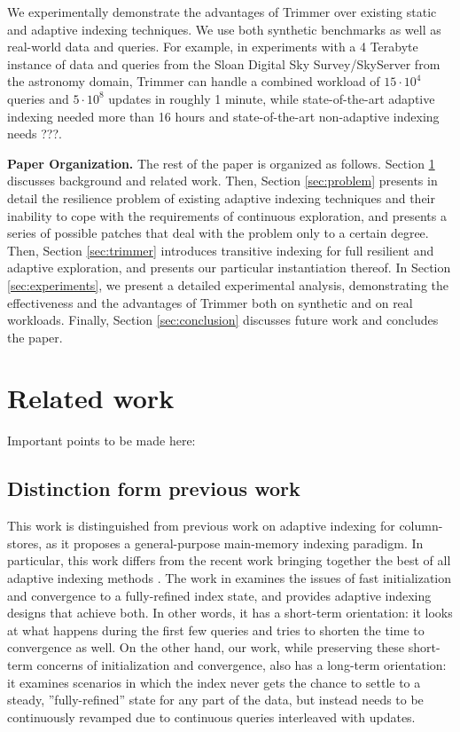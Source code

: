 \documentclass{sig-alternate}
\begin{document}
We experimentally demonstrate the advantages of Trimmer over existing static and adaptive indexing techniques. We use both synthetic benchmarks as well as real-world data and queries. For example, in experiments with a 4 Terabyte instance of data and queries from the Sloan Digital Sky Survey/SkyServer from the astronomy domain, Trimmer can handle a combined workload of $15\cdot10^4$ queries and $5\cdot10^8$ updates in roughly 1 minute, while state-of-the-art adaptive indexing needed more than 16 hours and state-of-the-art non-adaptive indexing needs ???.

\textbf{Paper Organization.}
The rest of the paper is organized as follows. Section \ref{sec:related} discusses background and related work. Then, Section \ref{sec:problem} presents in detail the resilience problem of existing adaptive indexing techniques and their inability to cope with the requirements of continuous exploration, and presents a series of possible patches that deal with the problem only to a certain degree. Then, Section \ref{sec:trimmer} introduces transitive indexing for full resilient and adaptive exploration, and presents our particular instantiation thereof. In Section \ref{sec:experiments}, we present a detailed experimental analysis, demonstrating the effectiveness and the advantages of Trimmer both on synthetic and on real workloads. Finally, Section \ref{sec:conclusion} discusses future work and concludes the paper.


\section{Related work}\label{sec:related}

Important points to be made here:

\subsection{Distinction form previous work}

This work is distinguished from previous work on adaptive indexing for column-stores, as it proposes a general-purpose main-memory indexing paradigm. In particular, this work differs from the recent work bringing together the best of all adaptive indexing methods \cite{AdaptiveIndexing}. The work in \cite{AdaptiveIndexing} examines the issues of fast initialization and convergence to a fully-refined index state, and provides adaptive indexing designs that achieve both. In other words, it has a short-term orientation: it looks at what happens during the first few queries and tries to shorten the time to convergence as well. On the other hand, our work, while preserving these short-term concerns of initialization and convergence, also has a long-term orientation: it examines scenarios in which the index never gets the chance to settle to a steady, ''fully-refined'' state for any part of the data, but instead needs to be continuously revamped due to continuous queries interleaved with updates.
\end{document}
